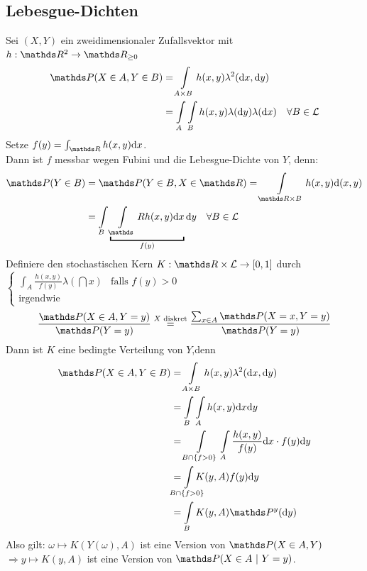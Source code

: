 \subsection{Lebesgue-Dichten}
\label{sub:lebesgue_dichten}
Sei $(X,Y)$ ein zweidimensionaler Zufallsvektor mit  $h:\R^2\to \R_{\ge 0}$\\
\begin{equation*}
\begin{aligned}
	\Pw(X\in A,Y\in B) &= \int\limits_{A\times B}h(x,y)\lambda^2(\dint x,\dint y)\\
	&= \int\limits_A\int\limits_B h(x,y) \lambda(\dint y)\lambda(\dint x)\quad \forall B\in \mathcal{L}
\end{aligned}
\end{equation*}
Setze $f(y)=\int_{\R}h(x,y)\dint x$.\\
Dann ist $f$ messbar wegen Fubini und die Lebesgue-Dichte von $Y$, denn:
\begin{equation*}
\begin{aligned}
	\Pw(Y\in B) &= \Pw(Y\in B,X\in \R)= \int\limits_{\R\times B}h(x,y)\dint(x,y)\\
	&=\int\limits_B\underbracket{\int\limits_\R h(x,y)\dint x}_{f(y)}\dint y \quad \forall B\in \mathcal{L}
\end{aligned}
\end{equation*}
Definiere den stochastischen Kern $K:\R\times \mathcal{L}\to[0,1]$ durch
$\left\{\begin{array}{cl} \int_A \frac{h(x,y)}{f(y)}\lambda(\dint x) & \text{falls } f(y)>0\\ \text{irgendwie}    \end{array}\right.$
\[ 
\frac{\Pw(X\in A,Y=y)}{\Pw(Y=y)}\stackrel{X\text{ diskret}}{=} \frac{\sum_{x\in A}\Pw(X=x,Y=y)}{\Pw(Y=y)} 
\]
Dann ist $K$ eine bedingte Verteilung von $Y$,denn
\begin{equation*}
\begin{aligned}
	\Pw(X\in A,Y\in B) &= \int\limits_{A\times B} h(x,y)\lambda^2(\dint x, \dint y)\\
	&= \int\limits_B\int\limits_Ah(x,y)\dint x \dint y\\
	&= \int\limits_{B\cap\{f>0\}}\int\limits_A \frac{h(x,y)}{f(y)}\dint x \cdot f(y)\dint y\\
	&= \int\limits_{\mathclap{B\cap\{f>0\}}}K(y,A)f(y)\dint y\\
	&= \int\limits_BK(y,A)\Pw^y(\dint y)
\end{aligned}
\end{equation*}
Also gilt: $\omega\mapsto K(Y(\omega),A)$ ist eine Version von $\Pw(X\in A,Y)$\\
$\Rightarrow y\mapsto K(y,A)$ ist eine Version von $\Pw(X\in A~|~Y=y)$.

